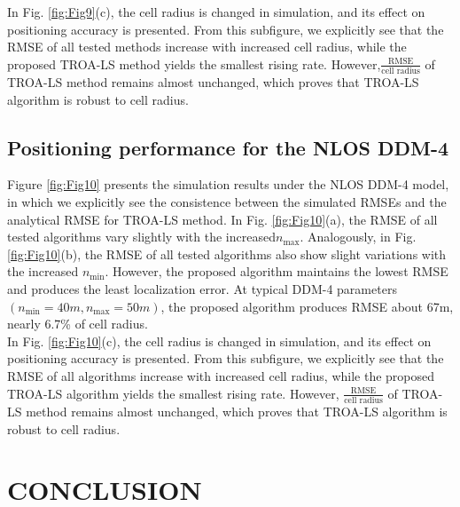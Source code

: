 \documentclass[journal]{IEEEtran}
\begin{document}
In Fig. \ref{fig:Fig9}(c), the cell radius is changed in simulation, and its effect on positioning accuracy is presented. From this subfigure, we explicitly see that the RMSE of all tested methods increase with increased cell radius, while the proposed TROA-LS method yields the smallest rising rate. However,{$\frac{\text{RMSE}}{\text{cell radius}}$} of TROA-LS method remains almost unchanged, which proves that TROA-LS algorithm is robust to cell radius.
\subsection{Positioning performance for the NLOS DDM-4}

Figure \ref{fig:Fig10} presents the simulation results under the NLOS DDM-4 model, in which we explicitly see the consistence between the simulated RMSEs and the analytical RMSE for TROA-LS method. In Fig. \ref{fig:Fig10}(a), the RMSE of all tested algorithms vary slightly with the increased$n_{\max}$. Analogously, in Fig. \ref{fig:Fig10}(b), the RMSE of all tested algorithms also show slight variations with the increased $n_{\min}$. However, the proposed algorithm maintains the lowest RMSE and produces the least localization error. At typical DDM-4 parameters $\left({n_{\min}} = 40m, {n_{\max}} = 50m\right)$, the proposed algorithm produces RMSE about 67m, nearly 6.7\% of cell radius.\\
\indent In Fig. \ref{fig:Fig10}(c), the cell radius is changed in simulation, and its effect on positioning accuracy is presented. From this subfigure, we explicitly see that the RMSE of all algorithms increase with increased cell radius, while the proposed TROA-LS algorithm yields the smallest rising rate. However, $\frac{\text{RMSE}}{\text{cell radius}}$ of TROA-LS method remains almost unchanged, which proves that TROA-LS algorithm is robust to cell radius.

\section{CONCLUSION}
\end{document}
